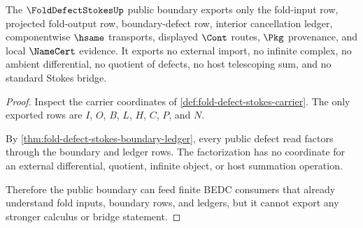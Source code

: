 \begin{theorem}
\label{thm:fold-defect-stokes-non-escape}
The $\FoldDefectStokesUp$ public boundary exports only the fold-input row, projected fold-output row, boundary-defect row, interior cancellation ledger, componentwise $\hsame$ transports, displayed $\Cont$ routes, $\Pkg$ provenance, and local $\NameCert$ evidence. It exports no external import, no infinite complex, no ambient differential, no quotient of defects, no host telescoping sum, and no standard Stokes bridge.
\end{theorem}
\begin{proof}
Inspect the carrier coordinates of \autoref{def:fold-defect-stokes-carrier}. The only exported rows are $I$, $O$, $B$, $L$, $H$, $C$, $P$, and $N$.

By \autoref{thm:fold-defect-stokes-boundary-ledger}, every public defect read factors through the boundary and ledger rows. The factorization has no coordinate for an external differential, quotient, infinite object, or host summation operation.

Therefore the public boundary can feed finite BEDC consumers that already understand fold inputs, boundary rows, and ledgers, but it cannot export any stronger calculus or bridge statement.
\end{proof}


\begin{closurestatus}{\FoldDefectStokesUp}
  \theoryclosure{\seedClosure}
  \formalstatus{\unformalizedV}
\end{closurestatus}
